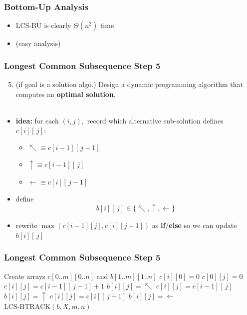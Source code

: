 \documentclass{beamer}
\newcommand{\stanza}{ \\~\ }
\begin{document}
\begin{frame} \frametitle{Bottom-Up Analysis}
  \begin{itemize}
    \item LCS-BU is clearly $\Theta(n^2)$ time
    \item (easy analysis)
  \end{itemize}
\end{frame}

\begin{frame} \frametitle{Longest Common Subsequence Step 5}
  \begin{enumerate}
    \setcounter{enumi}{4}
    \item (if goal is a solution algo.) Design a dynamic programming algorithm that computes an \textbf{optimal solution}.
    \stanza
  \end{enumerate}

  \begin{itemize}
    \item \textbf{idea:} for each $(i, j),$ record which alternative sub-solution defines $c[i][\, j]:$
      \begin{itemize}
        \item $\nwarrow \equiv c[i-1][\, j-1]$
        \item $\uparrow \equiv c[i-1][\, j]$
        \item $\leftarrow \equiv c[i][\, j - 1]$
      \end{itemize}
    \item define
      \[ b[i][\, j] \in \{ \nwarrow, \uparrow, \leftarrow \} \]
    \item rewrite $\max(c[i-1][j], c[i][j-1])$ as \textbf{if}/\textbf{else} so we can update $b[i][\, j]$
  \end{itemize}
\end{frame}

\begin{frame} \frametitle{Longest Common Subsequence Step 5}
  {\tiny
  \begin{algorithmic}[1]
    \State Create arrays $c[0..m][0..n]$ and $b[1..m][1..n]$ 
      \State $c[i][0] = 0$
    \EndFor
     
      \State $c[0][j] = 0$
    \EndFor
          \State $c[i][j] = c[i-1][\, j-1] + 1$
          \State $b[i][j] = \nwarrow$
          \State $c[i][j] = c[i-1][\, j]$
          \State $b[i][j] = \uparrow$
        \Else
        \State $c[i][j] = c[i][\, j-1]$
        \State $b[i][j] = \leftarrow$
      \EndIf
      \EndFor
    \EndFor
    \State \Return $\text{LCS-BTRACK}(b, X, m, n)$
    \EndFunction
  \end{algorithmic}
  }
\end{frame}
\end{document}
